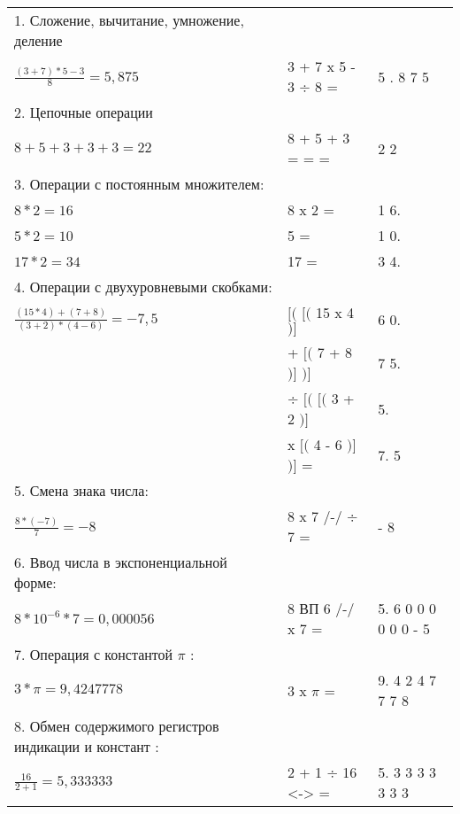 \documentclass[12pt]{article} %
\begin{document}
\begin{tabular}{ p{5cm} p{4cm} p{4cm} }
    1. Сложение, вычитание, умножение, деление \\
    $\frac{(3+7)*5-3}{8} = 5,875$ & 3 + 7 x 5 - 3 ÷ 8 = & 5 . 8 7 5 \\ 
    \vspace{0.1cm}

    2. Цепочные операции \\
    $8+5+3+3+3 = 22$ & 8 + 5 + 3 = = = & 2 2 \\
    \vspace{0.1cm}

    3. Операции с постоянным множителем: \\
    $8 * 2 = 16$ & 8 x 2 = & 1 6. \\ 
    $5 * 2 = 10$ & 5 = & 1 0. \\
    $17 * 2 = 34$ & 17 = & 3 4. \\
    \vspace{0.1cm}

    4. Операции с двухуровневыми скобками: \\
    $\frac{(15 * 4) + (7 + 8)}{(3 + 2) * (4 - 6)} = -7,5$ & $[($ $[($ 15 x 4 $)]$ & 6 0. \\ 
                                                          & + $[($ 7 + 8 $)]$ $)]$ & 7 5. \\ 
                                                          & ÷ $[($ $[($ 3 + 2 $)]$ & 5. \\ 
                                                          & x $[($ 4 - 6 $)]$ $)]$ = & 7. 5\\
    \vspace{0.1cm}

    5. Смена знака числа: \\
    $\frac{8 * (-7)}{7} = -8$ & 8 x 7 /-/ ÷ 7 = & - 8 \\
    \vspace{0.1cm}

    6. Ввод числа в экспоненциальной форме: \\
    $8 * 10^{-6} * 7 = 0,000056$ & 8 ВП 6 /-/ x 7 = & 5. 6 0 0 0 0 0 0 - 5 \\
    \vspace{0.1cm}

    7. Операция с константой $\pi$ : \\
    $3 * \pi = 9,4247778$ & 3 x $\pi$ = & 9. 4 2 4 7 7 7 8 \\ 
    \vspace{0.1cm}

    8. Обмен содержимого регистров индикации и констант : \\
    $\frac{16}{2+1} = 5,333333$ & 2 + 1 ÷ 16 <-> = & 5. 3 3 3 3 3 3 3 \\
\end{tabular}
\end{document}
